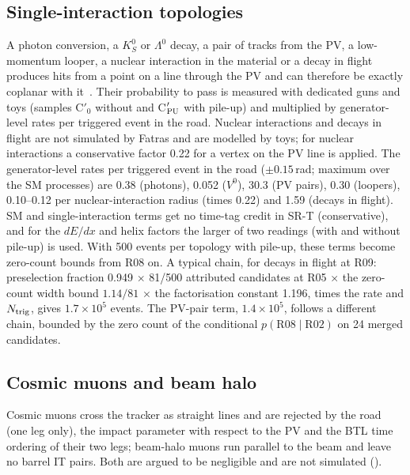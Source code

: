 \subsection{Single-interaction topologies}\label{sec:bkg:cprime}
A photon conversion, a $K^0_S$ or $\Lambda^0$ decay, a pair of tracks from the PV, a low-momentum looper, a nuclear
interaction in the material or a decay in flight produces hits from a point on a line through the PV and can therefore be
exactly coplanar with it~\cite[Sec.~III.D]{Knapen:2017kly}. Their probability to pass is measured with dedicated guns and
toys (samples C$'_0$ without and C$'_{\rm PU}$ with pile-up) and multiplied by generator-level rates per triggered event
in the road. Nuclear interactions and decays in flight are not simulated by Fatras and are modelled by toys; for nuclear
interactions a conservative factor 0.22 for a vertex on the PV line is applied.
The generator-level rates per triggered event in the road ($\pm0.15$\,rad; maximum over the SM processes) are 0.38
(photons), 0.052 ($V^0$), 30.3 (PV pairs), 0.30 (loopers), 0.10--0.12 per nuclear-interaction radius (times 0.22) and
1.59 (decays in flight). SM and single-interaction terms get no time-tag credit in SR-T (conservative), and for the $dE/dx$ and helix
factors the larger of two readings (with and without pile-up) is used. With 500 events per topology with pile-up, these
terms become zero-count bounds from R08 on. A typical chain, for decays in flight at R09: preselection fraction 0.949
$\times$ 81/500 attributed candidates at R05 $\times$ the zero-count width bound $1.14/81$ $\times$ the factorisation
constant 1.196, times the rate and $N_{\rm trig}$, gives $1.7\times10^5$ events. The PV-pair term, $1.4\times10^5$, follows
a different chain, bounded by the zero count of the conditional $p(\text{R08}\mid\text{R02})$ on 24 merged candidates.

\subsection{Cosmic muons and beam halo}\label{sec:bkg:cosmic}
Cosmic muons cross the tracker as straight lines and are rejected by the road (one leg only), the impact parameter with
respect to the PV and the BTL time ordering of their two legs; beam-halo muons run parallel to the beam and leave no barrel
IT pairs. Both are argued to be negligible and are not simulated (\EST{}).

